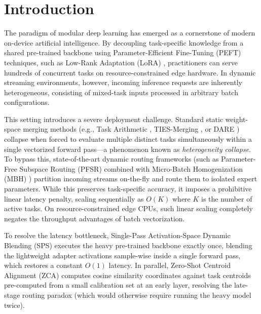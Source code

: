 \section{Introduction}
\label{sec:intro}

The paradigm of modular deep learning has emerged as a cornerstone of modern on-device artificial intelligence. By decoupling task-specific knowledge from a shared pre-trained backbone using Parameter-Efficient Fine-Tuning (PEFT) techniques, such as Low-Rank Adaptation (LoRA) \cite{hu2021lora}, practitioners can serve hundreds of concurrent tasks on resource-constrained edge hardware. In dynamic streaming environments, however, incoming inference requests are inherently heterogeneous, consisting of mixed-task inputs processed in arbitrary batch configurations. 

This setting introduces a severe deployment challenge. Standard static weight-space merging methods (e.g., Task Arithmetic \cite{ilharco2022editing}, TIES-Merging \cite{yadav2023ties}, or DARE \cite{yu2023dare}) collapse when forced to evaluate multiple distinct tasks simultaneously within a single vectorized forward pass—a phenomenon known as \textit{heterogeneity collapse}. To bypass this, state-of-the-art dynamic routing frameworks (such as Parameter-Free Subspace Routing (PFSR) \cite{pfsr2025} combined with Micro-Batch Homogenization (MBH) \cite{mbh2025}) partition incoming streams on-the-fly and route them to isolated expert parameters. While this preserves task-specific accuracy, it imposes a prohibitive linear latency penalty, scaling sequentially as $O(K)$ where $K$ is the number of active tasks. On resource-constrained edge CPUs, such linear scaling completely negates the throughput advantages of batch vectorization.

To resolve the latency bottleneck, Single-Pass Activation-Space Dynamic Blending (SPS) \cite{chatterjee2024robustness} executes the heavy pre-trained backbone exactly once, blending the lightweight adapter activations sample-wise inside a single forward pass, which restores a constant $O(1)$ latency. In parallel, Zero-Shot Centroid Alignment (ZCA) computes cosine similarity coordinates against task centroids pre-computed from a small calibration set at an early layer, resolving the late-stage routing paradox (which would otherwise require running the heavy model twice). 

